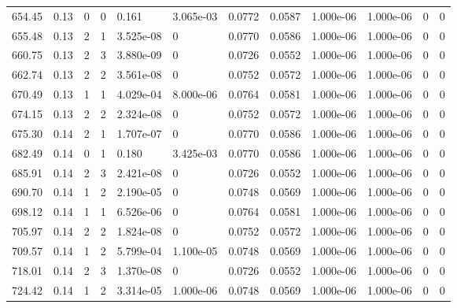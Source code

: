 \documentclass[preview]{standalone}
\begin{document}
{{{\begin{tabular}{L{1.2cm}C{1.2cm} C{0.3cm}C{0.5cm} C{1.4cm}C{1.4cm} C{1.4cm}C{1.4cm} C{1.6cm}C{1.6cm} C{1.6cm}C{1.6cm}}
  654.45  &  0.13  & 0     &  0 &  0.161  & 3.065e-03  &  0.0772&   0.0587& 1.000e-06 & 1.000e-06   &  0 & 0  \\ 
  655.48  &  0.13  & 2     &  1 &  3.525e-08  & 0  &  0.0770&   0.0586& 1.000e-06 & 1.000e-06   &  0 & 0  \\ 
  660.75  &  0.13  & 2     &  3 &  3.880e-09  & 0  &  0.0726&   0.0552& 1.000e-06 & 1.000e-06   &  0 & 0  \\ 
  662.74  &  0.13  & 2     &  2 &  3.561e-08  & 0  &  0.0752&   0.0572& 1.000e-06 & 1.000e-06   &  0 & 0  \\ 
  670.49  &  0.13  & 1     &  1 &  4.029e-04  & 8.000e-06  &  0.0764&   0.0581& 1.000e-06 & 1.000e-06   &  0 & 0  \\ 
  674.15  &  0.13  & 2     &  2 &  2.324e-08  & 0  &  0.0752&   0.0572& 1.000e-06 & 1.000e-06   &  0 & 0  \\ 
  675.30  &  0.14  & 2     &  1 &  1.707e-07  & 0  &  0.0770&   0.0586& 1.000e-06 & 1.000e-06   &  0 & 0  \\ 
  682.49  &  0.14  & 0     &  1 &  0.180  & 3.425e-03  &  0.0770&   0.0586& 1.000e-06 & 1.000e-06   &  0 & 0  \\ 
  685.91  &  0.14  & 2     &  3 &  2.421e-08  & 0  &  0.0726&   0.0552& 1.000e-06 & 1.000e-06   &  0 & 0  \\ 
  690.70  &  0.14  & 1     &  2 &  2.190e-05  & 0  &  0.0748&   0.0569& 1.000e-06 & 1.000e-06   &  0 & 0  \\ 
  698.12  &  0.14  & 1     &  1 &  6.526e-06  & 0  &  0.0764&   0.0581& 1.000e-06 & 1.000e-06   &  0 & 0  \\ 
  705.97  &  0.14  & 2     &  2 &  1.824e-08  & 0  &  0.0752&   0.0572& 1.000e-06 & 1.000e-06   &  0 & 0  \\ 
  709.57  &  0.14  & 1     &  2 &  5.799e-04  & 1.100e-05  &  0.0748&   0.0569& 1.000e-06 & 1.000e-06   &  0 & 0  \\ 
  718.01  &  0.14  & 2     &  3 &  1.370e-08  & 0  &  0.0726&   0.0552& 1.000e-06 & 1.000e-06   &  0 & 0  \\ 
  724.42  &  0.14  & 1     &  2 &  3.314e-05  & 1.000e-06  &  0.0748&   0.0569& 1.000e-06 & 1.000e-06   &  0 & 0  \\ 
\hline 
\end{tabular} 

}}}
\end{document}
